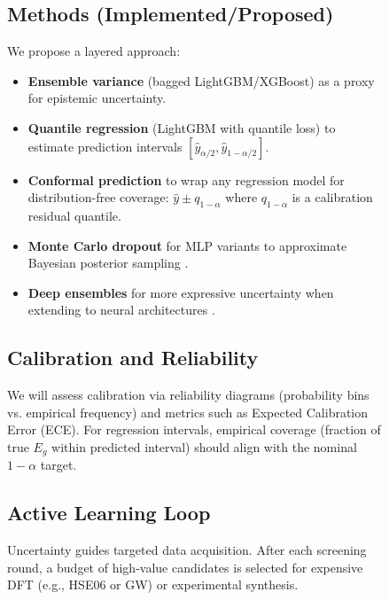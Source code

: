 \documentclass[conference]{IEEEtran}
\begin{document}
\begin{figure}[t!]
\subsection{Methods (Implemented/Proposed)}
We propose a layered approach:
\begin{itemize}
  \item \textbf{Ensemble variance} (bagged LightGBM/XGBoost) as a proxy for epistemic uncertainty.
  \item \textbf{Quantile regression} (LightGBM with quantile loss) to estimate prediction intervals $[\hat{y}_{\alpha/2}, \hat{y}_{1-\alpha/2}]$.
  \item \textbf{Conformal prediction} \cite{Papadopoulos2002Conformal} to wrap any regression model for distribution-free coverage: $\hat{y} \pm q_{1-\alpha}$ where $q_{1-\alpha}$ is a calibration residual quantile.
  \item \textbf{Monte Carlo dropout} for MLP variants to approximate Bayesian posterior sampling \cite{Gal2016Dropout}.
  \item \textbf{Deep ensembles} for more expressive uncertainty when extending to neural architectures \cite{Lakshminarayanan2017DE}.
\end{itemize}

\subsection{Calibration and Reliability}
We will assess calibration via reliability diagrams (probability bins vs. empirical frequency) and metrics such as Expected Calibration Error (ECE). For regression intervals, empirical coverage (fraction of true $E_g$ within predicted interval) should align with the nominal $1-\alpha$ target.

\FloatBarrier
\subsection{Active Learning Loop}
Uncertainty guides targeted data acquisition. After each screening round, a budget of high-value candidates is selected for expensive DFT (e.g., HSE06 or GW) or experimental synthesis.

\begin{figure}[h!]
\centering
{}
\label{fig:al_cycle}
\end{figure}


\end{figure}
\end{document}
